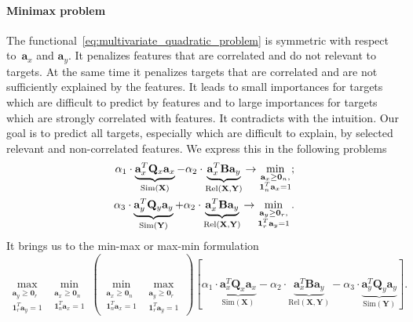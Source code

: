 \documentclass[12pt,twoside]{article}
\newcommand{\ba}{\mathbf{a}}
\newcommand{\bY}{\mathbf{Y}}
\newcommand{\bX}{\mathbf{X}}
\newcommand{\bB}{\mathbf{B}}
\newcommand{\bQ}{\mathbf{Q}}
\newcommand{\bOne}{\boldsymbol{1}}
\newcommand{\bZero}{\boldsymbol{0}}
\begin{document}
\paragraph{Minimax problem}

The functional~\eqref{eq:multivariate_quadratic_problem} is symmetric with respect to~$\ba_x$ and $\ba_y$. 
It penalizes features that are correlated and do not relevant to targets. 
At the same time it penalizes targets that are correlated and are not sufficiently explained by the features. 
It leads to small importances for targets which are difficult to predict by features and to large importances for targets which are strongly correlated with features. 
It contradicts with the intuition. 
Our goal is to predict all targets, especially which are difficult to explain, by selected relevant and non-correlated features. We express this in the following problems
\begin{align*}
	\alpha_1 \cdot \underbrace{\ba_x^T \bQ_x \ba_x}_{\text{Sim}(\bX)} - \alpha_2 \cdot \underbrace{\vphantom{()} \ba_x^T\mathbf{B} \ba_y}_{\text{Rel}(\bX, \bY)} \rightarrow \min_{\substack{\ba_x \geq \bZero_n, \\ \bOne_n^T\ba_x=1}}; \\
	\alpha_3 \cdot \underbrace{\ba_y^T \bQ_y \ba_y}_{\text{Sim}(\bY)} + \alpha_2 \cdot \underbrace{\vphantom{()} \ba_x^T \mathbf{B} \ba_y}_{\text{Rel}(\bX, \bY)} \rightarrow \min_{\substack{\ba_y \geq \bZero_r,  \\ \bOne_r^T\ba_y=1}}.
\end{align*}
It brings us to the min-max or max-min formulation
\begin{equation}
	\max_{\substack{\ba_y \geq \bZero_r \\ \bOne_r^T\ba_y=1}} \min_{\substack{\ba_x \geq \bZero_n \\ \bOne_n^T\ba_x=1}}  \left(\min_{\substack{\ba_x \geq \bZero_n \\ \bOne_n^T\ba_x=1}} 	\max_{\substack{\ba_y \geq \bZero_r \\ \bOne_r^T\ba_y=1}}\right)\left[\alpha_1 \cdot \underbrace{\ba_x^T \bQ_x \ba_x}_{\text{Sim}(\bX)} - \alpha_2 \cdot \underbrace{\ba_x^T \bB \ba_y}_{\text{Rel}(\bX, \bY)} - \alpha_3 \cdot \underbrace{\ba_y^T \bQ_y \ba_y}_{\text{Sim}(\bY)} \right].
	\label{eq:maxmin}
\end{equation}
\end{document}
